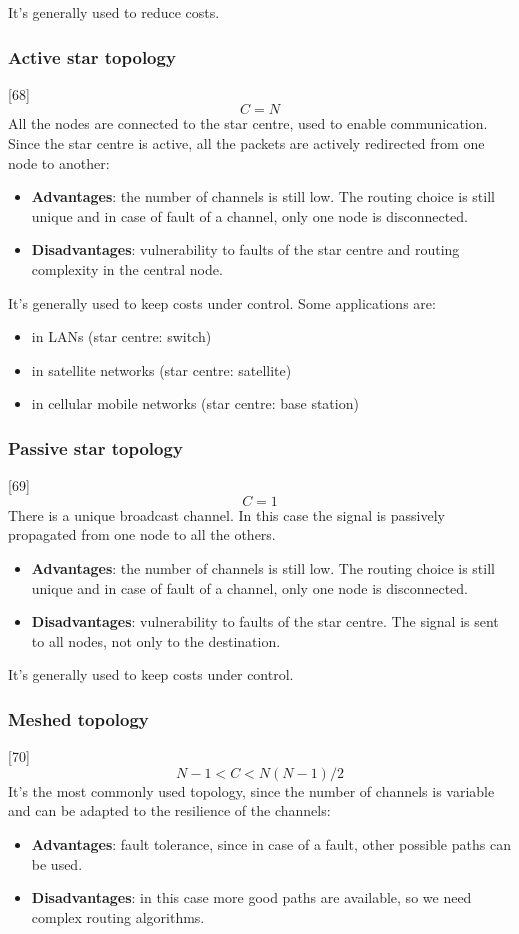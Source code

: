 \noindent It's generally used to reduce costs.

\subsubsection{Active star topology}
[68]
\[C=N\]
All the nodes are connected to the star centre, used to enable communication. Since the star centre is active, all the packets are actively redirected from one node to another:
\begin{itemize}
    \item \textbf{Advantages}: the number of channels is still low. The routing choice is still unique and in case of fault of a channel, only one node is disconnected.
    \item \textbf{Disadvantages}: vulnerability to faults of the star centre and routing complexity in the central node.
\end{itemize}

\noindent It's generally used to keep costs under control. Some applications are:
\begin{itemize}
    \item in LANs (star centre: switch)
    \item in satellite networks (star centre: satellite)
    \item in cellular mobile networks (star centre: base station)
\end{itemize}

\subsubsection{Passive star topology}
[69]
\[C=1\]
There is a unique broadcast channel. In this case the signal is passively propagated from one node to all the others.
\begin{itemize}
    \item \textbf{Advantages}: the number of channels is still low. The routing choice is still unique and in case of fault of a channel, only one node is disconnected.
    \item \textbf{Disadvantages}: vulnerability to faults of the star centre. The signal is sent to all nodes, not only to the destination.
\end{itemize}

\noindent It's generally used to keep costs under control.

\subsubsection{Meshed topology}
[70]
\[N-1<C<N(N-1)/2\]
It's the most commonly used topology, since the number of channels is variable and can be adapted to the resilience of the channels:
\begin{itemize}
    \item \textbf{Advantages}: fault tolerance, since in case of a fault, other possible paths can be used.
    \item \textbf{Disadvantages}: in this case more good paths are available, so we need complex routing algorithms.
\end{itemize}


